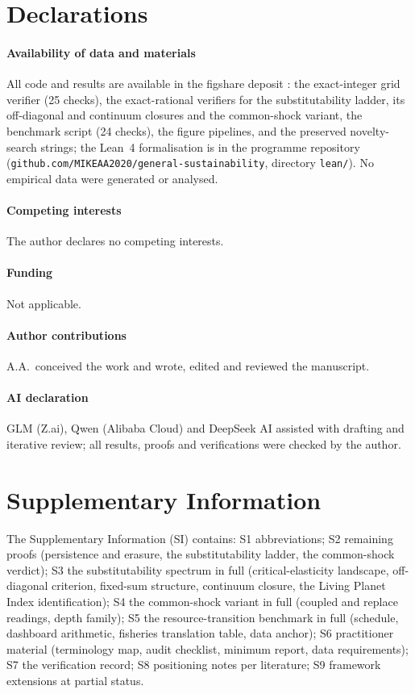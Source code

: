 \section*{Declarations}
\paragraph{Availability of data and materials} All code and results are available in the figshare deposit \citep{Abaee2026code}: the exact-integer grid verifier (25 checks), the exact-rational verifiers for the substitutability ladder, its off-diagonal and continuum closures and the common-shock variant, the benchmark script (24 checks), the figure pipelines, and the preserved novelty-search strings; the Lean~4 formalisation is in the programme repository (\texttt{github.com/MIKEAA2020/general-sustainability}, directory \texttt{lean/}). No empirical data were generated or analysed.
\paragraph{Competing interests} The author declares no competing interests.
\paragraph{Funding} Not applicable.
\paragraph{Author contributions} A.A.\ conceived the work and wrote, edited and reviewed the manuscript.
\paragraph{AI declaration} GLM (Z.ai), Qwen (Alibaba Cloud) and DeepSeek AI assisted with drafting and iterative review; all results, proofs and verifications were checked by the author.

\section*{Supplementary Information}
The Supplementary Information (SI) contains: S1 abbreviations; S2 remaining proofs (persistence and erasure, the substitutability ladder, the common-shock verdict); S3 the substitutability spectrum in full (critical-elasticity landscape, off-diagonal criterion, fixed-sum structure, continuum closure, the Living Planet Index identification); S4 the common-shock variant in full (coupled and replace readings, depth family); S5 the resource-transition benchmark in full (schedule, dashboard arithmetic, fisheries translation table, data anchor); S6 practitioner material (terminology map, audit checklist, minimum report, data requirements); S7 the verification record; S8 positioning notes per literature; S9 framework extensions at partial status.

